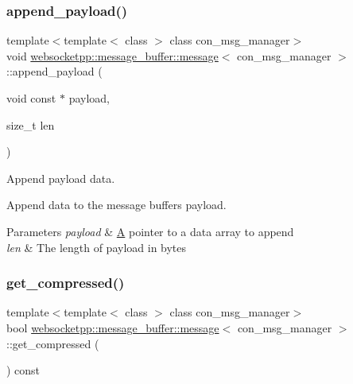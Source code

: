 \subsubsection{\texorpdfstring{append\+\_\+payload()}{append\_payload()}\hspace{0.1cm}{\footnotesize\ttfamily [2/2]}}
{\footnotesize\ttfamily template$<$template$<$ class $>$ class con\+\_\+msg\+\_\+manager$>$ \\
void \mbox{\hyperlink{classwebsocketpp_1_1message__buffer_1_1message}{websocketpp\+::message\+\_\+buffer\+::message}}$<$ con\+\_\+msg\+\_\+manager $>$\+::append\+\_\+payload (\begin{DoxyParamCaption}\item[{void const $\ast$}]{payload,  }\item[{size\+\_\+t}]{len }\end{DoxyParamCaption})\hspace{0.3cm}{\ttfamily [inline]}}



Append payload data. 

Append data to the message buffer\textquotesingle{}s payload.


\begin{DoxyParams}{Parameters}
{\em payload} & \mbox{\hyperlink{struct_a}{A}} pointer to a data array to append \\
\hline
{\em len} & The length of payload in bytes \\
\hline
\end{DoxyParams}
\mbox{\label{classwebsocketpp_1_1message__buffer_1_1message_a2ed58d11ccdedad8b6f9123897cff071}} 
\subsubsection{\texorpdfstring{get\+\_\+compressed()}{get\_compressed()}}
{\footnotesize\ttfamily template$<$template$<$ class $>$ class con\+\_\+msg\+\_\+manager$>$ \\
bool \mbox{\hyperlink{classwebsocketpp_1_1message__buffer_1_1message}{websocketpp\+::message\+\_\+buffer\+::message}}$<$ con\+\_\+msg\+\_\+manager $>$\+::get\+\_\+compressed (\begin{DoxyParamCaption}{ }\end{DoxyParamCaption}) const\hspace{0.3cm}{\ttfamily [inline]}}



